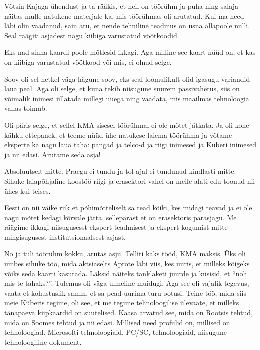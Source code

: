 Võtsin Kajaga ühendust ja ta  rääkis, et neil on töörühm ja puha ning salaja 
näitas mulle natukene  materjale ka, mis töörühmas oli arutatud. Kui ma  need  
läbi olin vaadanud, sain aru, et nende tehniline teadmus on üsna  allapoole 
nulli. Seal räägiti asjadest nagu kiibiga varustatud vöötkoodid. 


Eks nad sinna kaardi poole mõtlesid ikkagi. Aga milline see kaart nüüd on, et  
kas on kiibiga varustatud vöötkood või mis, ei olnud selge. 


Soov oli sel hetkel väga hägune soov, eks seal loomulikult olid igasugu 
variandid laua peal. Aga oli selge, et kuna tekib niisugune suurem 
passivahetus, siis on võimalik inimesi üllatada millegi uuega ning vaadata, mis 
maailmas tehnoloogia vallas toimub. 

Oli päris selge, et sellel KMA-sisesel 
töörühmal ei ole mõtet jätkata. Ja oli kohe kähku ettepanek, et teeme nüüd ühe 
natukese laiema töörühma ja võtame  eksperte ka nagu laua taha: pangad ja 
telco-d ja riigi inimesed ja Küberi inimesed ja nii edasi. Arutame 
seda asja!


Absoluutselt mitte. Praegu ei tundu ja tol ajal ei tundunud kindlasti mitte. 
Sihuke laiapõhjaline koostöö riigi ja erasektori vahel on meile alati edu 
toonud nii ühes kui teises. 


Eesti on nii väike riik et põhimõtteliselt sa tead kõiki, kes midagi teavad ja 
ei ole nagu mõtet kedagi kõrvale jätta, sellepärast et on erasektoris 
parasjagu. Me räägime ikkagi niisugusesst  ekspert-teadmisest ja 
ekspert-kogumist mitte mingisugusest institutsionaalsest asjast. 

No ja tuli töörühm kokku, arutas asju. Telliti kaks tööd, 
KMA maksis. Üks oli umbes sihuke töö, 
mida aktsiaselts Aprote läbi viis, kes uuris, et milleks kõigeks 
võiks seda kaarti kasutada. Läksid näiteks tanklaketi juurde ja küsisid, et 
\enquote{noh mis te tahaks?}. Tulemus oli väga ulmeline muidugi. Aga see oli 
vajalik tegevus,  vaata et kohustuslik samm, et sa pead uurima turu ootusi. 
Teine töö, mida siis meie Küberis tegime, oli see, et me tegime  
tehnoloogilise ülevaate, et milleks tänapäeva kiipkaardid on suutelised. Kaasa 
arvatud see,  mida on Rootsis tehtud, mida on Soomes tehtud ja nii edasi.  
Millised need profiilid on, millised on tehnoloogiad. Microsofti tehnoloogiaid, 
PC/SC, tehnoloogiaid, niisugune 
tehnoloogiline dokument. 

